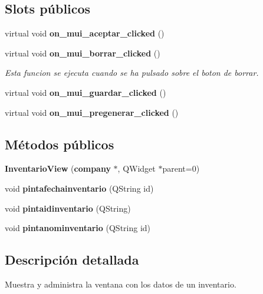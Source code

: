 \subsection*{Slots p\'{u}blicos}
\begin{CompactItemize}
\item 
virtual void {\bf on\_\-mui\_\-aceptar\_\-clicked} ()\label{classInventarioView_i0}

\item 
virtual void {\bf on\_\-mui\_\-borrar\_\-clicked} ()\label{classInventarioView_i1}

\begin{CompactList}\small\item\em Esta funcion se ejecuta cuando se ha pulsado sobre el boton de borrar. \item\end{CompactList}\item 
virtual void {\bf on\_\-mui\_\-guardar\_\-clicked} ()\label{classInventarioView_i2}

\item 
virtual void {\bf on\_\-mui\_\-pregenerar\_\-clicked} ()\label{classInventarioView_i3}

\end{CompactItemize}
\subsection*{M\'{e}todos p\'{u}blicos}
\begin{CompactItemize}
\item 
{\bf Inventario\-View} ({\bf company} $\ast$, QWidget $\ast$parent=0)
\item 
void {\bf pintafechainventario} (QString id)\label{classInventarioView_a1}

\item 
void {\bf pintaidinventario} (QString)\label{classInventarioView_a2}

\item 
void {\bf pintanominventario} (QString id)\label{classInventarioView_a3}

\end{CompactItemize}


\subsection{Descripci\'{o}n detallada}
Muestra y administra la ventana con los datos de un inventario. 



